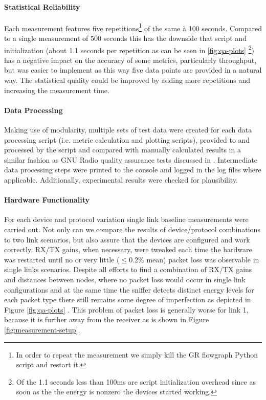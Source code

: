\paragraph{Statistical Reliability}
Each measurement features five repetitions\footnote{In order to repeat the measurement we simply kill the GR flowgraph Python script and restart it.} of the same à 100 seconds. Compared to a single measurement of 500 seconds this has the downside that script and  initialization (about 1.1 seconds per repetition as can be seen in \ref{fig:qa-plots} \footnote{Of the 1.1 seconds less than 100ms are script initialization overhead since as soon as the the energy is nonzero the devices started working.}) has a negative impact on the accuracy of some metrics, particularly throughput, but was easier to implement as this way five data points are provided in a natural way. The statistical quality could be improved by adding more repetitions and increasing the measurement time. 

\paragraph{Data Processing}
Making use of modularity, multiple sets of test data were created for each data processing script (i.e. metric calculation and plotting scripts), provided to and processed by the script and compared with manually calculated results in a similar fashion as GNU Radio quality assurance tests discussed in \cite{gr-python-tut}. Intermediate data processing steps were printed to the console and logged in the log files where applicable. Additionally, experimental results were checked for plausibility. 

\paragraph{Hardware Functionality}
For each device and protocol variation single link baseline measurements were carried out. Not only can we compare the results of device/protocol combinations to two link scenarios, but also assure that the devices are configured and work correctly. RX/TX gains, when necessary, were tweaked each time the hardware was restarted until no or very little ($\le0.2\%$ mean) packet loss was observable in single links scenarios.
Despite all efforts to find a combination of RX/TX gains and distances between nodes, where no packet loss would occur in single link configurations and at the same time the sniffer detects distinct energy levels for each packet type there still remains some degree of imperfection as depicted in Figure \ref{fig:qa-plots} . This problem of packet loss is generally worse for link 1, because it is further away from the receiver as is shown in Figure \ref{fig:measurement-setup}.  

